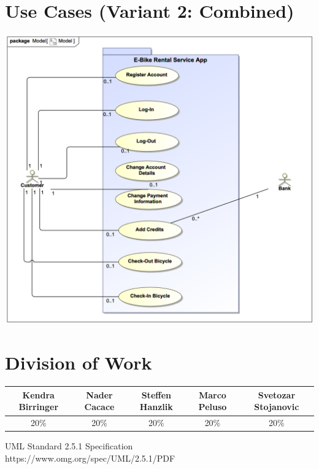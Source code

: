 \documentclass[a4paper, 12pt]{article}
\begin{document}
\section{Use Cases (Variant 2: Combined)}
\begin{center}
\includegraphics[scale=0.5]{02-e-bike-rental-service-variant-2.png}
\end{center}

\newpage
\section{Division of Work}
\renewcommand{\arraystretch}{1.5}
\begin{tabular}{|c|c|c|c|c|}
\hline
Kendra Birringer    & Nader Cacace  & Steffen Hanzlik   & Marco Peluso  & Svetozar Stojanovic\\
\hline
20\%                & 20\%          & 20\%              & 20\%          & 20\%\\
\hline
\end{tabular}
\newpage

\begin{thebibliography}{2}

UML Standard 2.5.1 Specification\\
https://www.omg.org/spec/UML/2.5.1/PDF

\end{thebibliography}
\end{document}

